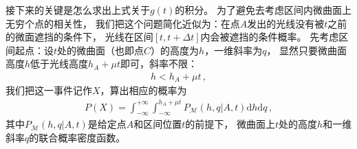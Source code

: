 接下来的关键是怎么求出上式关于$g(t)$的积分。
为了避免去考虑区间内微曲面上无穷个点的相关性，
我们把这个问题简化近似为：在点$A$发出的光线没有被$t$之前的微面遮挡的条件下，
光线在区间$[t,t+\Delta t]$内会被遮挡的条件概率。
先考虑区间起点：设$t$处的微曲面（也即点$C$）的高度为$h$，一维斜率为$q$，
显然只要微曲面高度$h$低于光线高度$h_A+\mu t$即可，斜率不限：
\begin{align}
    h<h_A+\mu t\, ,
\end{align}
我们把这一事件记作$X$，算出相应的概率为
\begin{align}
    P(X)=\int_{-\infty}^{+\infty}\int_{-\infty}^{h_A+\mu t}
    P_{\mathcal{M}}(h,q|A,t)\mathrm{d}h\mathrm{d}q\, ,
\end{align}
其中$P_{\mathcal{M}}(h,q|A,t)$是给定点$A$和区间位置$t$的前提下，
微曲面上$t$处的高度$h$和一维斜率$q$的联合概率密度函数。

